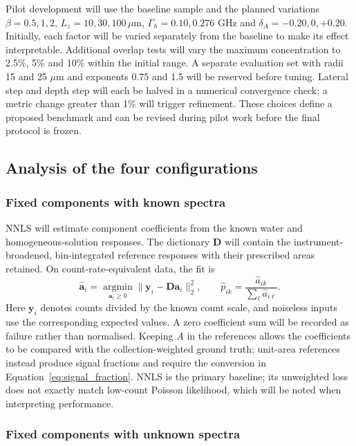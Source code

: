 \documentclass[11pt]{article}
\begin{document}
Pilot development will use the baseline sample and the planned variations $\beta=0.5,1,2$, $L_z=10,30,100\,\mu\mathrm m$, $\Gamma_h=0.10,0.276$ GHz and $\delta_A=-0.20,0,+0.20$. Initially, each factor will be varied separately from the baseline to make its effect interpretable. Additional overlap tests will vary the maximum concentration to 2.5\%, 5\% and 10\% within the initial range. A separate evaluation set with radii 15 and 25 $\mu\mathrm m$ and exponents 0.75 and 1.5 will be reserved before tuning. Lateral step and depth step will each be halved in a numerical convergence check; a metric change greater than 1\% will trigger refinement. These choices define a proposed benchmark and can be revised during pilot work before the final protocol is frozen.

\subsection{Analysis of the four configurations}
\subsubsection{Fixed components with known spectra}

NNLS will estimate component coefficients from the known water and homogeneous-solution responses. The dictionary $\mathbf D$ will contain the instrument-broadened, bin-integrated reference responses with their prescribed areas retained. On count-rate-equivalent data, the fit is
\begin{equation}
 \widehat{\mathbf a}_i=\underset{\mathbf a_i\geq0}{\operatorname{argmin}}
 \|\mathbf y_i-\mathbf D\mathbf a_i\|_2^2,
 \qquad \widehat p_{ik}=\frac{\widehat a_{ik}}{\sum_\ell\widehat a_{i\ell}}.
 \label{eq:known_fit}
\end{equation}
Here $\mathbf y_i$ denotes counts divided by the known count scale, and noiseless inputs use the corresponding expected values. A zero coefficient sum will be recorded as failure rather than normalised. Keeping $A$ in the references allows the coefficients to be compared with the collection-weighted ground truth; unit-area references instead produce signal fractions and require the conversion in Equation~\ref{eq:signal_fraction}. NNLS is the primary baseline; its unweighted loss does not exactly match low-count Poisson likelihood, which will be noted when interpreting performance.

\subsubsection{Fixed components with unknown spectra}
\end{document}
